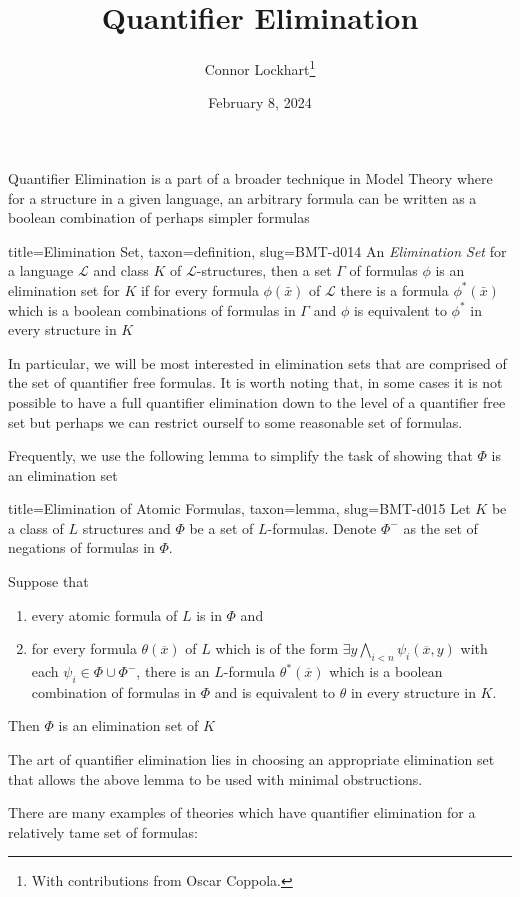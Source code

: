 \documentclass[a4paper]{article}
\title{Quantifier Elimination}
\date{February 8, 2024}
\author{Connor Lockhart\thanks{With contributions from Oscar Coppola.}}
\begin{document}
\maketitle
\par{Quantifier Elimination is a part of a broader technique in Model Theory where for a structure in a given language, an arbitrary formula can be written as a boolean combination of perhaps simpler formulas}
\begin{tree}{title={Elimination Set}, taxon={definition}, slug={BMT-d014}}
An \emph{Elimination Set} for a language \(\mathcal {L}\) and class \(K\) of \(\mathcal {L}\)-structures, then a set \(\Gamma\) of formulas \(\phi\) is an elimination set for \(K\) if for every formula \(\phi ( \bar {x})\) of \(\mathcal {L}\) there is a formula \(\phi ^*( \bar {x})\) which is a boolean combinations of formulas in \(\Gamma\) and \(\phi\) is equivalent to \(\phi ^*\) in every structure in \(K\)
\end{tree}
\par{In particular, we will be most interested in elimination sets that are comprised of the set of quantifier free formulas. It is worth noting that, in some cases it is not possible to have a full quantifier elimination down to the level of a quantifier free set but perhaps we can restrict ourself to some reasonable set of formulas.}\par{Frequently, we use the following lemma to simplify the task of showing that \(\Phi\) is an elimination set}
\begin{tree}{title={Elimination of Atomic Formulas}, taxon={lemma}, slug={BMT-d015}}
Let \(K\) be a class of \(L\) structures and \(\Phi\) be a set of \(L\)-formulas. Denote \(\Phi ^-\) as the set of negations of formulas in \(\Phi\).\par{Suppose that 
  \begin{enumerate}
\item{every atomic formula of \(L\) is in \(\Phi\) and} 
    \item{for every formula \(\theta ( \overline {x})\) of \(L\) which is of the form \(\exists  y  \bigwedge _{i<n}  \psi _i ( \overline {x},y)\) with each \(\psi _i  \in   \Phi \cup   \Phi ^-\), there is an \(L\)-formula \(\theta ^*( \overline {x})\) which is a boolean combination of formulas in \(\Phi\) and is equivalent to \(\theta\) in every structure in \(K\).}
\end{enumerate}
  Then \(\Phi\) is an elimination set of \(K\)}
\end{tree}
\par{The art of quantifier elimination lies in choosing an appropriate elimination set that allows the above lemma to be used with minimal obstructions. }\par{There are many examples of theories which have quantifier elimination for a relatively tame set of formulas: }
  
\end{document}
